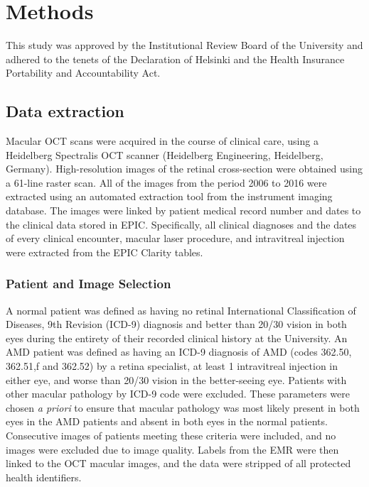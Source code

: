 \section{Methods}

This study was approved by the Institutional Review Board of
the University
and adhered to the tenets of the Declaration of Helsinki and the Health
Insurance Portability and Accountability Act.

\subsection{Data extraction}
Macular OCT scans were acquired in the course of clinical care, using a
Heidelberg Spectralis OCT scanner (Heidelberg Engineering, Heidelberg, Germany).
High-resolution images of the retinal cross-section were obtained using a
61-line raster scan. All of the images from the period 2006 to 2016 were
extracted using an automated extraction tool from the instrument imaging
database. The images were linked by patient medical record number and dates to
the clinical data stored in EPIC. Specifically, all clinical diagnoses and the
dates of every clinical encounter, macular laser procedure, and intravitreal
injection were extracted from the EPIC Clarity tables.

\subsubsection{Patient and Image Selection}

A normal patient was defined as having no retinal International Classification
of Diseases, 9th Revision (ICD-9) diagnosis and better than 20/30 vision in both
eyes during the entirety of their recorded clinical history at the University. An AMD
patient was defined as having an ICD-9 diagnosis of AMD (codes 362.50, 362.51,f
and 362.52) by a retina specialist, at least 1 intravitreal injection in either
eye, and worse than 20/30 vision in the better-seeing eye. Patients with other
macular pathology by ICD-9 code were excluded. These parameters were chosen
\emph{a priori} to ensure that macular pathology was most likely present in both
eyes in the AMD patients and absent in both eyes in the normal patients.
Consecutive images of patients meeting these criteria were included, and no
images were excluded due to image quality. Labels from the EMR were then linked
to the OCT macular images, and the data were stripped of all protected health
identifiers.

